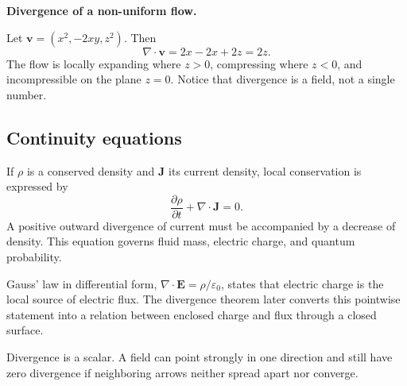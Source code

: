 \begin{workedexample}
\textbf{Divergence of a non-uniform flow.}\par
Let $\mathbf v=(x^2,-2xy,z^2)$. Then
\[
\nabla\cdot\mathbf v=2x-2x+2z=2z.
\]
The flow is locally expanding where $z>0$, compressing where $z<0$, and incompressible on the plane $z=0$. Notice that divergence is a field, not a single number.
\end{workedexample}

\subsection{Continuity equations}

If $\rho$ is a conserved density and $\mathbf J$ its current density, local conservation is expressed by
\[
\boxed{\frac{\partial\rho}{\partial t}+\nabla\cdot\mathbf J=0.}
\]
A positive outward divergence of current must be accompanied by a decrease of density. This equation governs fluid mass, electric charge, and quantum probability.

\begin{keyidea}
Gauss' law in differential form, $\nabla\cdot\mathbf E=\rho/\varepsilon_0$, states that electric charge is the local source of electric flux. The divergence theorem later converts this pointwise statement into a relation between enclosed charge and flux through a closed surface.
\end{keyidea}

\begin{mistakebox}
Divergence is a scalar. A field can point strongly in one direction and still have zero divergence if neighboring arrows neither spread apart nor converge.
\end{mistakebox}
